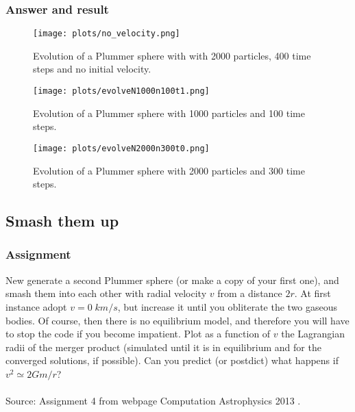 \documentclass[a4paper]{article}
\begin{document}
\subsubsection{Answer and result}
\begin{figure}[h!]
  \begin{center}
    \texttt{[image: plots/no\_velocity.png]}
    \caption{\label{fig:errorplotx}Evolution of a Plummer sphere with with 2000 particles, 400 time steps and no initial velocity.}
  \end{center}
\end{figure}
\begin{figure}[h!]
  \begin{center}
    \texttt{[image: plots/evolveN1000n100t1.png]}
    \caption{\label{fig:errorplotxx}Evolution of a Plummer sphere with 1000 particles and 100 time steps.}
  \end{center}
\end{figure}
\begin{figure}[h!]
  \begin{center}
    \texttt{[image: plots/evolveN2000n300t0.png]}
    \caption{\label{fig:errorplotxxx}Evolution of a Plummer sphere with 2000 particles and 300 time steps.}
  \end{center}
\end{figure}
\clearpage
\subsection{Smash them up}
\subsubsection{Assignment}
New generate a second Plummer sphere (or make a copy of your first one), and smash them into each other with radial velocity $v$ from a distance $2 r$. At first instance adopt $v = 0\;km/s$, but increase it until you obliterate the two gaseous bodies. Of course, then there is no equilibrium model, and therefore you will have to stop the code if you become impatient. Plot as a function of $v$ the Lagrangian radii of the merger product (simulated until it is in equilibrium and for the converged solutions, if possible). Can you predict (or postdict) what happens if $v^2 \simeq 2 Gm/r$?\\
\\
Source: Assignment 4 from webpage Computation Astrophysics 2013 \cite{ass4}.
\end{document}

